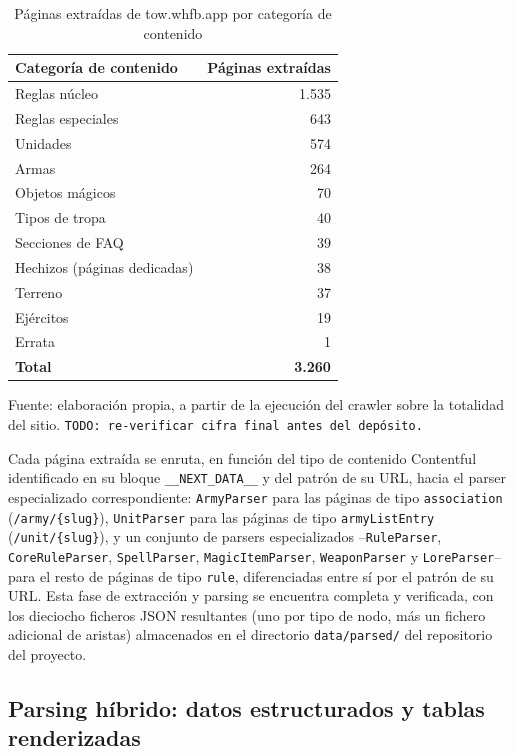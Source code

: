 \documentclass[11pt,a4paper,spanish]{book}
\numberwithin{equation}{chapter}
\numberwithin{figure}{chapter}
\numberwithin{table}{chapter}
\begin{document}
\begin{table}[h]
\centering
\begin{tabular}{|l|r|}
	\hline
	\textbf{Categoría de contenido} & \textbf{Páginas extraídas} \\
	\hline
	Reglas núcleo & 1.535 \\
	\hline
	Reglas especiales & 643 \\
	\hline
	Unidades & 574 \\
	\hline
	Armas & 264 \\
	\hline
	Objetos mágicos & 70 \\
	\hline
	Tipos de tropa & 40 \\
	\hline
	Secciones de FAQ & 39 \\
	\hline
	Hechizos (páginas dedicadas) & 38 \\
	\hline
	Terreno & 37 \\
	\hline
	Ejércitos & 19 \\
	\hline
	Errata & 1 \\
	\hline
	\textbf{Total} & \textbf{3.260} \\
	\hline
\end{tabular}
\caption{Páginas extraídas de tow.whfb.app por categoría de contenido}
\label{tab:scraping-metricas}
{\footnotesize\centering Fuente: elaboración propia, a partir de la ejecución del crawler sobre la totalidad del sitio. \texttt{TODO: re-verificar cifra final antes del depósito.}\par}
\end{table}

Cada página extraída se enruta, en función del tipo de contenido Contentful identificado en su bloque \texttt{\_\_NEXT\_DATA\_\_} y del patrón de su URL, hacia el parser especializado correspondiente: \texttt{ArmyParser} para las páginas de tipo \texttt{association} (\texttt{/army/\{slug\}}), \texttt{UnitParser} para las páginas de tipo \texttt{armyListEntry} (\texttt{/unit/\{slug\}}), y un conjunto de parsers especializados --\texttt{RuleParser}, \texttt{CoreRuleParser}, \texttt{SpellParser}, \texttt{MagicItemParser}, \texttt{WeaponParser} y \texttt{LoreParser}-- para el resto de páginas de tipo \texttt{rule}, diferenciadas entre sí por el patrón de su URL. Esta fase de extracción y parsing se encuentra completa y verificada, con los dieciocho ficheros JSON resultantes (uno por tipo de nodo, más un fichero adicional de aristas) almacenados en el directorio \texttt{data/parsed/} del repositorio del proyecto.

\subsection{Parsing híbrido: datos estructurados y tablas renderizadas}
\end{document}
